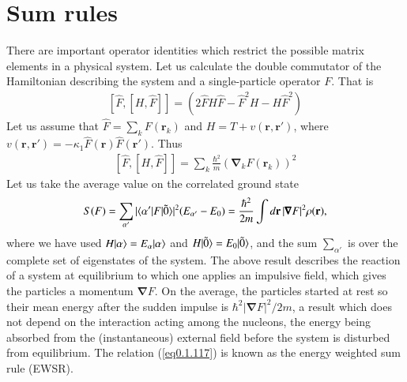 \section{Sum rules}\label{Sect1.7}
There are important operator identities which restrict the possible matrix elements in a physical system. Let us calculate the double commutator of the Hamiltonian describing the system and a single-particle operator $F$. That is
\begin{align}\label{eq0.1.115}
\left[\hat F,\left[H,\hat F\right]\right]=\left(2\hat FH\hat F-\hat F^2H-H\hat F^2\right)
\end{align}
Let us assume that $\hat F=\sum_k F(\mathbf r_k)$ and $H=T+v(\mathbf r, \mathbf r')$, where $v(\mathbf r,\mathbf r')=-\kappa_1 \hat F(\mathbf r)\hat F(\mathbf r')$. Thus 
\begin{align}\label{eq0.1.116}
\left[\hat F,\left[H,\hat F\right]\right]=\sum_k\frac{\hbar^2}{m}\left(\pmb \nabla_kF(\mathbf r_k)\right)^2
\end{align}
Let us take the average value on the correlated ground state
\begin{align}\label{eq0.1.117}
S(F)=\sum_{\alpha'}|\langle {\alpha'|F|\tilde 0} \rangle|^2(E_{\alpha'}-E_0)=\frac{\hbar^2}{2m}\int d\mathbf r\, |\pmb\nabla F|^2\rho(\mathbf r),
\end{align}
where we have used $H|{\alpha} \rangle=E_\alpha|{\alpha} \rangle$ and $H|{\tilde 0} \rangle=E_0|{\tilde 0} \rangle$, and the sum $\sum_{\alpha'}$ is over the complete set of eigenstates of the system. The above result describes the reaction of a system at equilibrium to which one applies an impulsive field, which gives the particles a momentum $\pmb \nabla F$. On the average, the particles started at rest so their mean energy after the sudden impulse is $\hbar^2|\pmb \nabla F|^2/2m$, a result which does not depend on the interaction acting among the nucleons, the energy being absorbed from the (instantaneous) external field before the system is disturbed from equilibrium. The relation (\ref{eq0.1.117}) is known as the energy weighted sum rule (EWSR). 

